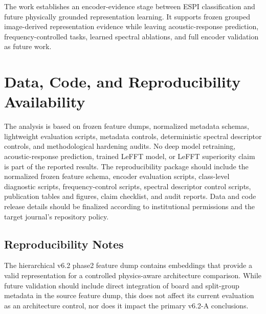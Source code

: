 \documentclass[review,3p,times]{elsarticle}
\begin{document}
The work establishes an encoder-evidence stage between ESPI classification and future physically grounded representation learning. It supports frozen grouped image-derived representation evidence while leaving acoustic-response prediction, frequency-controlled tasks, learned spectral ablations, and full encoder validation as future work.


\section*{Data, Code, and Reproducibility Availability}
The analysis is based on frozen feature dumps, normalized metadata schemas, lightweight evaluation scripts, metadata controls, deterministic spectral descriptor controls, and methodological hardening audits. No deep model retraining, acoustic-response prediction, trained LeFFT model, or LeFFT superiority claim is part of the reported results. The reproducibility package should include the normalized frozen feature schema, encoder evaluation scripts, class-level diagnostic scripts, frequency-control scripts, spectral descriptor control scripts, publication tables and figures, claim checklist, and audit reports. Data and code release details should be finalized according to institutional permissions and the target journal's repository policy.

\subsection*{Reproducibility Notes}
The hierarchical v6.2 phase2 feature dump contains embeddings that provide a valid representation for a controlled physics-aware architecture comparison. While future validation should include direct integration of board and split-group metadata in the source feature dump, this does not affect its current evaluation as an architecture control, nor does it impact the primary v6.2-A conclusions.
\end{document}
